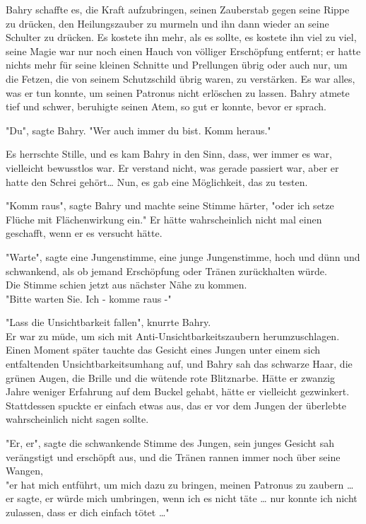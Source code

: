 {Bahry schaffte es, die Kraft aufzubringen, seinen Zauberstab gegen seine Rippe zu drücken, den Heilungszauber zu murmeln und ihn dann wieder an seine Schulter zu drücken. Es kostete ihn mehr, als es sollte, es kostete ihn viel zu viel, seine Magie war nur noch einen Hauch von völliger Erschöpfung entfernt; er hatte nichts mehr für seine kleinen Schnitte und Prellungen übrig oder auch nur, um die Fetzen, die von seinem Schutzschild übrig waren, zu verstärken. Es war alles, was er tun konnte, um seinen Patronus nicht erlöschen zu lassen. Bahry atmete tief und schwer, beruhigte seinen Atem, so gut er konnte, bevor er sprach.

"Du", sagte Bahry. "Wer auch immer du bist. Komm heraus."

Es herrschte Stille, und es kam Bahry in den Sinn, dass, wer immer es war, vielleicht bewusstlos war. Er verstand nicht, was gerade passiert war, aber er hatte den Schrei gehört… Nun, es gab eine Möglichkeit, das zu testen.

"Komm raus", sagte Bahry und machte seine Stimme härter, "oder ich setze Flüche mit Flächenwirkung ein." Er hätte wahrscheinlich nicht mal einen geschafft, wenn er es versucht hätte.

"Warte", sagte eine Jungenstimme, eine junge Jungenstimme, hoch und dünn und schwankend, als ob jemand Erschöpfung oder Tränen zurückhalten würde.\\ Die Stimme schien jetzt aus nächster Nähe zu kommen.\\ "Bitte warten Sie. Ich - komme raus -"

"Lass die Unsichtbarkeit fallen", knurrte Bahry.\\ Er war zu müde, um sich mit Anti-Unsichtbarkeitszaubern herumzuschlagen. Einen Moment später tauchte das Gesicht eines Jungen unter einem sich entfaltenden Unsichtbarkeitsumhang auf, und Bahry sah das schwarze Haar, die grünen Augen, die Brille und die wütende rote Blitznarbe. Hätte er zwanzig Jahre weniger Erfahrung auf dem Buckel gehabt, hätte er vielleicht gezwinkert. Stattdessen spuckte er einfach etwas aus, das er vor dem Jungen der überlebte wahrscheinlich nicht sagen sollte.

"Er, er", sagte die schwankende Stimme des Jungen, sein junges Gesicht sah verängstigt und erschöpft aus, und die Tränen rannen immer noch über seine Wangen,\\ "er hat mich entführt, um mich dazu zu bringen, meinen Patronus zu zaubern … er sagte, er würde mich umbringen, wenn ich es nicht täte … nur konnte ich nicht zulassen, dass er dich einfach tötet …"

}
